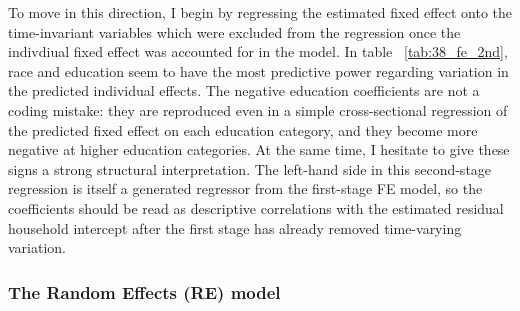 \par To move in this direction, I begin by regressing the estimated fixed effect onto the time-invariant variables which were excluded from the regression once the indivdiual fixed effect was accounted for in the model. In table ~\ref{tab:38_fe_2nd}, race and education seem to have the most predictive power regarding variation in the predicted individual effects. The negative education coefficients are not a coding mistake: they are reproduced even in a simple cross-sectional regression of the predicted fixed effect on each education category, and they become more negative at higher education categories. At the same time, I hesitate to give these signs a strong structural interpretation. The left-hand side in this second-stage regression is itself a generated regressor from the first-stage FE model, so the coefficients should be read as descriptive correlations with the estimated residual household intercept after the first stage has already removed time-varying variation.

\begin{table}[H]
\centering
\caption{\textbf{Explaining Estimated Fixed Effect with Time-Invariant Controls}}
\label{tab:38_fe_2nd}
\begin{threeparttable}
\begingroup
\setlength{\tabcolsep}{3pt}%
\renewcommand{\arraystretch}{0.70}%
\small%
\resizebox{\textwidth}{!}{%
%
}%
\endgroup
\begin{tablenotes}[flushleft]
\footnotesize
\item {}%
\end{tablenotes}
\end{threeparttable}
\end{table}


\subsubsection{The Random Effects (RE) model}

